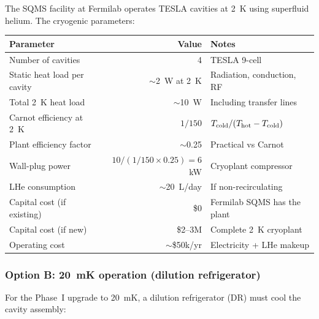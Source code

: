 \documentclass[11pt]{article}
\theoremstyle{definition}
\theoremstyle{remark}
\begin{document}
The SQMS facility at Fermilab operates TESLA cavities at 2~K using
superfluid helium. The cryogenic parameters:

\begin{center}
\renewcommand{\arraystretch}{1.3}
\begin{tabular}{lrl}
\toprule
Parameter & Value & Notes \\
\midrule
Number of cavities & 4 & TESLA 9-cell \\
Static heat load per cavity & $\sim$2~W at 2~K & Radiation, conduction, RF \\
Total 2~K heat load & $\sim$10~W & Including transfer lines \\
Carnot efficiency at 2~K & $1/150$ & $T_{\rm cold}/(T_{\rm hot}-T_{\rm cold})$ \\
Plant efficiency factor & $\sim$0.25 & Practical vs Carnot \\
Wall-plug power & $10/(1/150\times 0.25) = 6$~kW & Cryoplant compressor \\
LHe consumption & $\sim$20~L/day & If non-recirculating \\
\midrule
Capital cost (if existing) & \$0 & Fermilab SQMS has the plant \\
Capital cost (if new) & \$2--3M & Complete 2~K cryoplant \\
Operating cost & $\sim$\$50k/yr & Electricity + LHe makeup \\
\bottomrule
\end{tabular}
\end{center}

\subsubsection{Option B: 20~mK operation (dilution refrigerator)}

For the Phase~I upgrade to 20~mK, a dilution refrigerator (DR) must
cool the cavity assembly:
\end{document}
